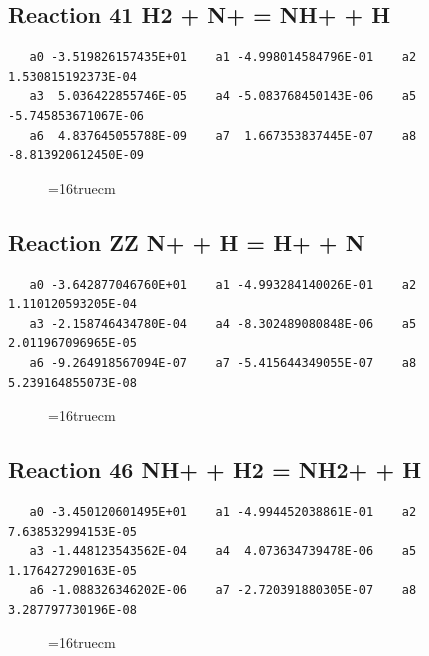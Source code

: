 \documentclass[12pt,dvipdfm]{article}
\begin{document}
\subsection{
Reaction 41 H2 + N+ = NH+ + H}
\begin{small}\begin{verbatim}
   a0 -3.519826157435E+01    a1 -4.998014584796E-01    a2  1.530815192373E-04
   a3  5.036422855746E-05    a4 -5.083768450143E-06    a5 -5.745853671067E-06
   a6  4.837645055788E-09    a7  1.667353837445E-07    a8 -8.813920612450E-09
   \end{verbatim}\end{small}
\begin{figure}[h!]
\label{n2rates}
\epsfxsize=16truecm
\end{figure}
\newpage

\subsection{
Reaction ZZ N+ + H = H+ + N}
\begin{small}\begin{verbatim}
   a0 -3.642877046760E+01    a1 -4.993284140026E-01    a2  1.110120593205E-04
   a3 -2.158746434780E-04    a4 -8.302489080848E-06    a5  2.011967096965E-05
   a6 -9.264918567094E-07    a7 -5.415644349055E-07    a8  5.239164855073E-08
   \end{verbatim}\end{small}
\begin{figure}[h!]
\label{n2rates}
\epsfxsize=16truecm
\end{figure}
\newpage

\subsection{
Reaction 46 NH+ + H2 = NH2+ + H}
\begin{small}\begin{verbatim}
   a0 -3.450120601495E+01    a1 -4.994452038861E-01    a2  7.638532994153E-05
   a3 -1.448123543562E-04    a4  4.073634739478E-06    a5  1.176427290163E-05
   a6 -1.088326346202E-06    a7 -2.720391880305E-07    a8  3.287797730196E-08
   \end{verbatim}\end{small}
\begin{figure}[h!]
\label{n2rates}
\epsfxsize=16truecm
\end{figure}
\newpage
\end{document}
